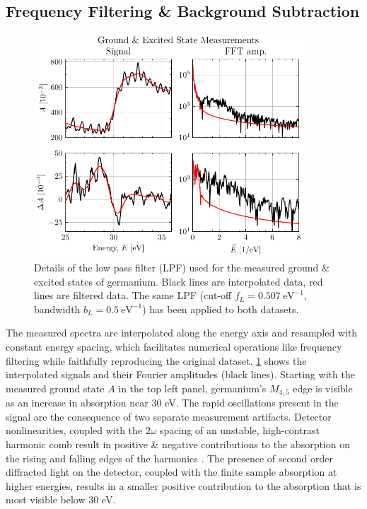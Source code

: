 \subsection{Frequency Filtering \& Background Subtraction}

\begin{figure}
	\centering
	\includegraphics[width=0.9\textwidth]{figures/chap4/unfiltered_A_dA.pdf}
	\caption{Details of the low pass filter (LPF) used for the measured ground \& excited states of germanium. Black lines are interpolated data, red lines are filtered data. The same LPF (cut-off $f_L = 0.507 \ \textrm{eV}^{-1}$, bandwidth $b_L = 0.5 \ \textrm{eV}^{-1}$) has been applied to both datasets.}
	\label{fig:unfiltered_A_dA}
\end{figure}

The measured spectra are interpolated along the energy axis and resampled with constant energy spacing, which facilitates numerical operations like frequency filtering while faithfully reproducing the original dataset. \cref{fig:unfiltered_A_dA} shows the interpolated signals and their Fourier amplitudes (black lines). Starting with the measured ground state $A$ in the top left panel, germanium's $M_{4,5}$ edge is visible as an increase in absorption near 30 eV. The rapid oscillations present in the signal are the consequence of two separate measurement artifacts. Detector nonlinearities, coupled with the $2 \omega$ spacing of an unstable, high-contrast harmonic comb result in positive \& negative contributions to the absorption on the rising and falling edges of the harmonics \cite{linImpactSpatialChirp2016,cirriAchievingSurfaceSensitivity2017}. The presence of second order diffracted light on the detector, coupled with the finite sample absorption at higher energies, results in a smaller positive contribution to the absorption that is most visible below 30 eV.

